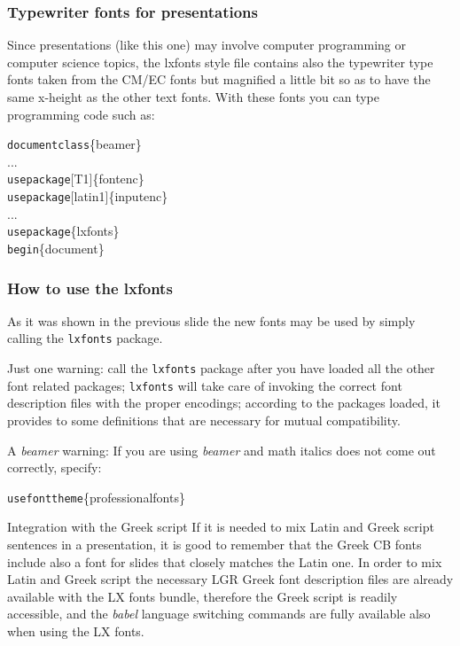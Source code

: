 \documentclass{beamer}\errorcontextlines=9
\newcommand*\cs[1]{\texttt{\char92#1}}
\newcommand\pack[1]{\textsl{#1}}
\begin{document}
\begin{frame}\frametitle{Typewriter fonts for presentations}
Since presentations (like this one) may involve computer programming or computer science topics, the lxfonts style file contains also the typewriter type fonts taken from the CM/EC fonts but magnified a little bit so as to have the same x-height as the other text fonts. With these fonts you can type programming code such as:
\begin{flushleft}\ttfamily
\cs{documentclass}\{beamer\}\\
...\\
\cs{usepackage}[T1]\{fontenc\}\\
\cs{usepackage}[latin1]\{inputenc\}\\
...\\
\cs{usepackage}\{lxfonts\}\\
\cs{begin}\{document\}
\end{flushleft}
\end{frame}



\begin{frame}\frametitle{How to use the lxfonts}
As it was shown in the previous slide the new fonts may be used by simply calling the \texttt{lxfonts} package.

\alert{Just one warning}: call the \texttt{lxfonts} package after you have loaded all the other font related packages; \texttt{lxfonts} will take care of invoking the correct font description files with the proper encodings; according to the packages loaded, it provides to some definitions that are necessary for mutual compatibility.

\alert{A \textsl{beamer} warning}: If you are using \textsl{beamer} and math italics does not come out correctly, specify:
\begin{flushleft}\ttfamily
\cs{usefonttheme}\{professionalfonts\}
\end{flushleft}
\end{frame}

\begin{frame}{Integration with the Greek script}
If it is needed to mix Latin and Greek script sentences in a presentation, it is good to remember that the Greek CB fonts include also  a font for slides that closely matches the Latin one. In order to mix Latin and Greek script the necessary  LGR Greek font description files are already available with the LX fonts bundle, therefore the Greek script is readily accessible, and the \pack{babel} language switching commands are fully available also when using the LX fonts.
\end{frame}
\end{document}
